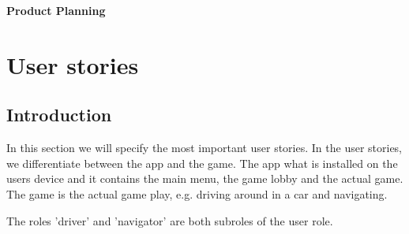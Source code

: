 \documentclass{article}
\begin{document}
\begin{minipage}[H]{\textwidth}
\vspace{0.3cm}
		\begin{center}
		
		\vspace{0.3cm}
			\Huge{\textbf{Product Planning}}\\
		\vspace{0.3cm}	
		
		\vspace{0.7cm}	
		\end{center}
\end{minipage}	
\section{User stories}
\subsection{Introduction}
In this section we will specify the most important user stories. In the user stories, we differentiate between the app and the game. The app what is installed on the users device and it contains the main menu, the game lobby and the actual game. The game is the actual game play, e.g. driving around in a car and navigating.

The roles 'driver' and 'navigator' are both subroles of the user role.
\end{document}
